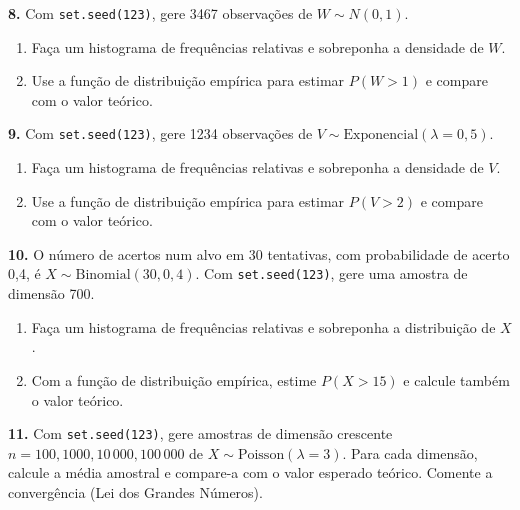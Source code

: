 \documentclass[
  portuguese,
  11pt,
  openany]{book}
\providecommand{\tightlist}{%
  \setlength{\itemsep}{0pt}\setlength{\parskip}{0pt}}
\begin{document}
\textbf{8.} Com \texttt{set.seed(123)}, gere 3467 observações de \(W \sim N(0, 1)\).

\begin{enumerate}
\def\labelenumi{(\alph{enumi})}
\tightlist
\item
  Faça um histograma de frequências relativas e sobreponha a densidade de \(W\).
\item
  Use a função de distribuição empírica para estimar \(P(W > 1)\) e compare com o valor
  teórico.
\end{enumerate}

\textbf{9.} Com \texttt{set.seed(123)}, gere 1234 observações de \(V \sim \text{Exponencial}(\lambda = 0{,}5)\).

\begin{enumerate}
\def\labelenumi{(\alph{enumi})}
\tightlist
\item
  Faça um histograma de frequências relativas e sobreponha a densidade de \(V\).
\item
  Use a função de distribuição empírica para estimar \(P(V > 2)\) e compare com o valor
  teórico.
\end{enumerate}

\textbf{10.} O número de acertos num alvo em 30 tentativas, com probabilidade de acerto 0,4,
é \(X \sim \text{Binomial}(30, 0{,}4)\). Com \texttt{set.seed(123)}, gere uma amostra de dimensão
700.

\begin{enumerate}
\def\labelenumi{(\alph{enumi})}
\tightlist
\item
  Faça um histograma de frequências relativas e sobreponha a distribuição de \(X\).
\item
  Com a função de distribuição empírica, estime \(P(X > 15)\) e calcule também o valor
  teórico.
\end{enumerate}

\textbf{11.} Com \texttt{set.seed(123)}, gere amostras de dimensão crescente
\(n = 100, 1000, 10\,000, 100\,000\) de \(X \sim \text{Poisson}(\lambda = 3)\). Para cada
dimensão, calcule a média amostral e compare-a com o valor esperado teórico. Comente a
convergência (Lei dos Grandes Números).
\end{document}
